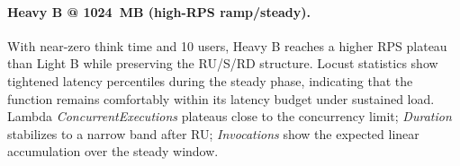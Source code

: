 \documentclass[11pt,a4paper]{article}
\begin{document}


\paragraph{Heavy B @ \SI{1024}{MB} (high-RPS ramp/steady).}
With near-zero think time and 10 users, Heavy B reaches a higher RPS plateau than Light B while preserving the RU/S/RD structure. Locust statistics show tightened latency percentiles during the steady phase, indicating that the function remains comfortably within its latency budget under sustained load. Lambda \emph{ConcurrentExecutions} plateaus close to the concurrency limit; \emph{Duration} stabilizes to a narrow band after RU; \emph{Invocations} show the expected linear accumulation over the steady window.



\end{document}
